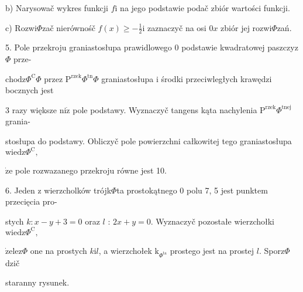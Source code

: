 \documentclass[a4paper,12pt]{article}
\begin{document}
b) Narysowač wykres funkcji $f\mathrm{i}$ na jego podstawie podač zbiór wartości funkcji.

c) Rozwi$\Phi$zač nierównośč $f(x)\displaystyle \geq-\frac{1}{2}\mathrm{i}$ zaznaczyč na osi $0x$ zbiór jej rozwi$\Phi$zań.

5. Pole przekroju graniastosłupa prawidlowego $0$ podstawie kwadratowej paszczyz$\Phi$ prze-

$\mathrm{c}\mathrm{h}\mathrm{o}\mathrm{d}\mathrm{z}\Phi^{\mathrm{C}}\Phi$ przez $\mathrm{P}^{\mathrm{r}\mathrm{z}\mathrm{e}\mathrm{k}}\Phi^{\mathrm{t}\mathrm{n}}\Phi$ graniastosłupa $\mathrm{i}$ środki przeciwległych krawędzi bocznych jest

3 razy większe $\mathrm{n}\mathrm{i}\dot{\mathrm{z}}$ pole podstawy. Wyznaczyč tangens kąta nachylenia $\mathrm{P}^{\mathrm{r}\mathrm{z}\mathrm{e}\mathrm{k}}\Phi^{\mathrm{t}\mathrm{n}\mathrm{e}\mathrm{j}}$ grania-

stosłupa do podstawy. Obliczyč pole powierzchni całkowitej tego graniastosłupa $\mathrm{w}\mathrm{i}\mathrm{e}\mathrm{d}\mathrm{z}\Phi^{\mathrm{C}},$

$\dot{\mathrm{z}}\mathrm{e}$ pole rozwazanego przekroju równe jest 10.

6. Jeden $\mathrm{z}$ wierzcholków trójk$\Phi$ta prostokątnego $0$ polu 7, 5 jest punktem przecięcia pro-

stych $k:x-y+3=0$ oraz $l$ : $2x+y=0$. Wyznaczyč pozostałe wierzchołki $\mathrm{w}\mathrm{i}\mathrm{e}\mathrm{d}\mathrm{z}\Phi^{\mathrm{C}},$

$\dot{\mathrm{z}}\mathrm{e}\mathrm{l}\mathrm{e}\mathrm{z}\Phi$ one na prostych $k\mathrm{i}l$, a wierzchołek $\mathrm{k}_{\Phi^{\mathrm{t}\mathrm{a}}}$ prostego jest na prostej $l$. Sporz$\Phi$dzič

staranny rysunek.
\end{document}
